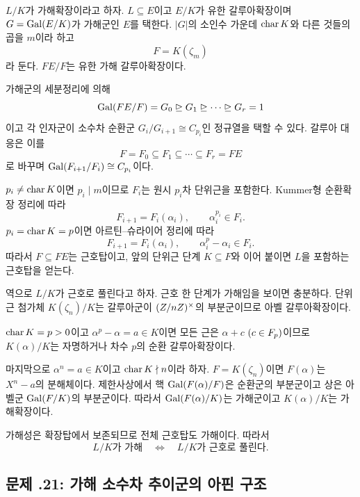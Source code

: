 \begin{solution}
$L/K$가 가해확장이라고 하자. $L\subseteq E$이고 $E/K$가 유한
갈루아확장이며 $G=\operatorname{Gal}(E/K)$가 가해군인 $E$를 택한다. $|G|$의
소인수 가운데 $\operatorname{char} K$와 다른 것들의 곱을 $m$이라 하고
\[
  F=K(\zeta_m)
\]
라 둔다. $FE/F$는 유한 가해 갈루아확장이다.

가해군의 세분정리에 의해
\[
  \operatorname{Gal}(FE/F)=G_0\trianglerighteq G_1
  \trianglerighteq\cdots\trianglerighteq G_r=1
\]
이고 각 인자군이 소수차 순환군
$G_i/G_{i+1}\cong C_{p_i}$인 정규열을 택할 수 있다. 갈루아 대응은
이를
\[
  F=F_0\subseteq F_1\subseteq\cdots\subseteq F_r=FE
\]
로 바꾸며 $\operatorname{Gal}(F_{i+1}/F_i)\cong C_{p_i}$이다.

$p_i\ne\operatorname{char} K$이면 $p_i\mid m$이므로 $F_i$는 원시 $p_i$차
단위근을 포함한다. Kummer형 순환확장 정리에 따라
\[
  F_{i+1}=F_i(\alpha_i),
  \qquad \alpha_i^{p_i}\in F_i.
\]
$p_i=\operatorname{char} K=p$이면 아르틴--슈라이어 정리에 따라
\[
  F_{i+1}=F_i(\alpha_i),
  \qquad \alpha_i^p-\alpha_i\in F_i.
\]
따라서 $F\subseteq FE$는 근호탑이고, 앞의 단위근 단계
$K\subseteq F$와 이어 붙이면 $L$을 포함하는 근호탑을 얻는다.

역으로 $L/K$가 근호로 풀린다고 하자. 근호 한 단계가 가해임을
보이면 충분하다. 단위근 첨가체 $K(\zeta_n)/K$는 갈루아군이
$(Z/nZ)^\times$의 부분군이므로 아벨 갈루아확장이다.

$\operatorname{char} K=p>0$이고 $\alpha^p-\alpha=a\in K$이면 모든 근은
$\alpha+c$ $(c\in F_p)$이므로 $K(\alpha)/K$는 자명하거나 차수
$p$의 순환 갈루아확장이다.

마지막으로 $\alpha^n=a\in K$이고 $\operatorname{char} K\nmid n$이라 하자.
$F=K(\zeta_n)$이면 $F(\alpha)$는 $X^n-a$의 분해체이다. 제한사상에서
핵 $\operatorname{Gal}(F(\alpha)/F)$은 순환군의 부분군이고 상은 아벨군
$\operatorname{Gal}(F/K)$의 부분군이다. 따라서 $\operatorname{Gal}(F(\alpha)/K)$는 가해군이고
$K(\alpha)/K$는 가해확장이다.

가해성은 확장탑에서 보존되므로 전체 근호탑도 가해이다. 따라서
\[
  \boxed{
  L/K\text{가 가해}
  \quad\Longleftrightarrow\quad
  L/K\text{가 근호로 풀린다}.}
\]
\end{solution}

\subsection*{문제 \thechapter.21: 가해 소수차 추이군의 아핀 구조}

